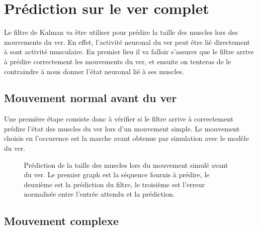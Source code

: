 
\section{Prédiction sur le ver complet} %
\label{sec:Prédiction sur le ver complet}

Le filtre de Kalman va être utiliser pour prédire la taille des muscles lors
des mouvements du ver. En effet, l'activité neuronal du ver peut être lié
directement à sont activité musculaire.  En premier lieu il va falloir
s'assurer que le filtre arrive à prédire correctement les mouvements du ver, et
ensuite on tenteras de le contraindre à nous donner l'état neuronal lié à ses
muscles.

\subsection{Mouvement normal avant du ver} %
\label{sub:Mouvement normal avant du ver}

Une première étape consiste donc à vérifier si le filtre arrive à correctement
prédire l'état des muscles du ver lors d'un mouvement simple. Le mouvement
choisis en l'occurence est la marche avant obtenue par simulation avec le
modèle du ver.

\begin{figure}[ht]
   \begin{center}
   \end{center}
   \caption[Prédiction de de la taille des muscles lors du mouvement simulé
   avant du ver]{Prédiction de la taille des muscles lors du mouvement simulé
   avant du ver. Le premier graph est la séquence fournis à prédire, le
   deuxième est la prédiction du filtre, le troisième est l'erreur normalisée
   entre l'entrée attendu et la prédiction.}
   \label{fig:sequence_ver_complet}
\end{figure}



\subsection{Mouvement complexe} %
\label{sub:Mouvement complexe}



